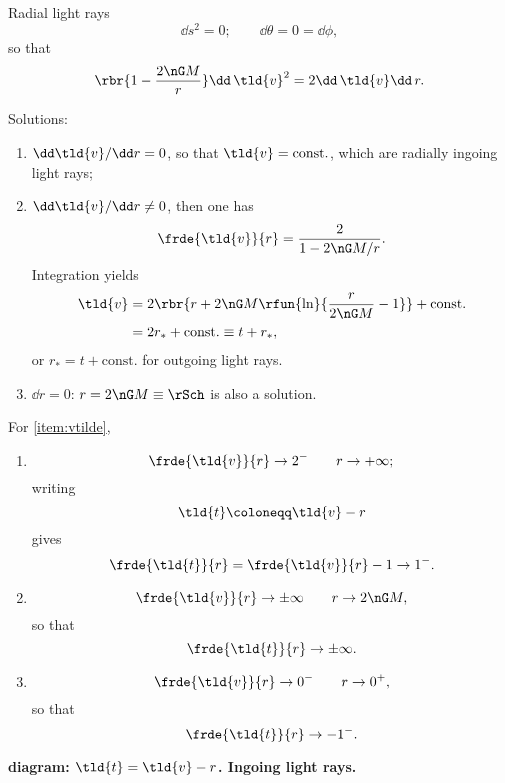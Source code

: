 \begin{nameddef}{Radial light rays}
\begin{equation}
\dd s^2 = 0;\qquad \dd \theta = 0 = \dd \phi,
\end{equation}
so that
\begin{equation}
\rbr{1-\frac{2\nG M}{r}}\dd\,\tld{v}^2 = 2\dd\,\tld{v}\dd\, r.
\end{equation}

Solutions:
\begin{enumerate}
\item
$\dd\tld{v}/\dd r = 0$, so that $\tld{v} = \text{const.}$, which are radially
ingoing light rays;

\item \label{item:vtilde}
$\dd\tld{v}/\dd r \ne 0$, then one has
\begin{equation}
\frde{\tld{v}}{r} = \frac{2}{1-2\nG M/r}.
\end{equation}
Integration yields
\begin{align}
\tld{v} &= 2\rbr{r+2\nG M\rfun{\ln}{\frac{r}{2\nG M} -1}} + \text{const.} \\
&=2r_* + \text{const.} \equiv t+r_*,
\end{align}
or $r_* = t+\text{const.}$ for outgoing light rays.

\item
$\dd r = 0$: $r = 2\nG M \equiv \rSch$ is also a solution.
\end{enumerate}

For \cref{item:vtilde},
\begin{enumerate}
\item
\[\frde{\tld{v}}{r} \to 2^- \qquad r \to +\infty;\]
writing
\begin{equation}
\tld{t}\coloneqq \tld{v} - r
\end{equation}
gives
\begin{equation}
\frde{\tld{t}}{r} = \frde{\tld{v}}{r} -1 \to 1^-.
\end{equation}

\item 
\[\frde{\tld{v}}{r} \to \pm\infty \qquad r \to 2\nG M,\]
so that
\begin{equation}
\frde{\tld{t}}{r} \to \pm\infty.
\end{equation}

\item 
\[\frde{\tld{v}}{r} \to 0^- \qquad r \to 0^+,\]
so that
\begin{equation}
\frde{\tld{t}}{r} \to -1^-.
\end{equation}
\end{enumerate}
\textbf{diagram: $\tld{t} = \tld{v} - r$. Ingoing light rays.}


\end{nameddef}
